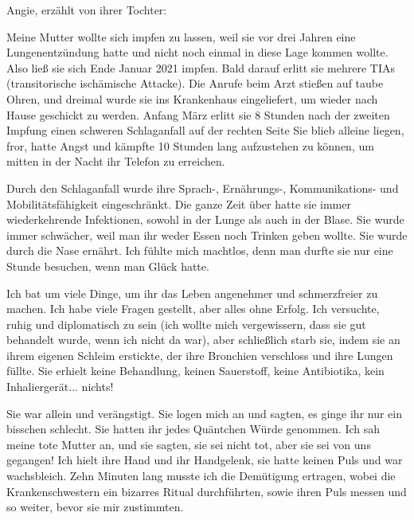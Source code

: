 Angie, erzählt von ihrer Tochter:

Meine Mutter wollte sich impfen zu lassen, weil sie vor drei Jahren eine
Lungenentzündung hatte und nicht noch einmal in diese Lage kommen wollte. Also
ließ sie sich Ende Januar 2021 impfen. Bald darauf erlitt sie mehrere TIAs
(transitorische ischämische Attacke).  Die Anrufe beim Arzt stießen auf taube
Ohren, und dreimal wurde sie ins Krankenhaus eingeliefert, um wieder nach Hause
geschickt zu werden. Anfang März erlitt sie 8 Stunden nach der zweiten Impfung
einen schweren Schlaganfall auf der rechten Seite Sie blieb alleine liegen,
fror, hatte Angst und kämpfte 10 Stunden lang aufzustehen zu können, um mitten
in der Nacht ihr Telefon zu erreichen.

Durch den Schlaganfall wurde ihre Sprach-, Ernährungs-, Kommunikations- und
Mobilitätsfähigkeit eingeschränkt. Die ganze Zeit über hatte sie immer
wiederkehrende Infektionen, sowohl in der Lunge als auch in der Blase. Sie wurde
immer schwächer, weil man ihr weder Essen noch Trinken geben wollte. Sie wurde
durch die Nase ernährt. Ich fühlte mich machtlos, denn man durfte sie nur eine
Stunde besuchen, wenn man Glück hatte.

Ich bat um viele Dinge, um ihr das Leben angenehmer und schmerzfreier zu
machen. Ich habe viele Fragen gestellt, aber alles ohne Erfolg. Ich versuchte,
ruhig und diplomatisch zu sein (ich wollte mich vergewissern, dass sie gut
behandelt wurde, wenn ich nicht da war), aber schließlich starb sie, indem sie
an ihrem eigenen Schleim erstickte, der ihre Bronchien verschloss und ihre
Lungen füllte. Sie erhielt keine Behandlung, keinen Sauerstoff, keine
Antibiotika, kein Inhaliergerät... nichts!

Sie war allein und verängstigt. Sie logen mich an und sagten, es ginge ihr nur
ein bisschen schlecht. Sie hatten ihr jedes Quäntchen Würde genommen. Ich sah
meine tote Mutter an, und sie sagten, sie sei nicht tot, aber sie sei von uns
gegangen! Ich hielt ihre Hand und ihr Handgelenk, sie hatte keinen Puls und war
wachsbleich. Zehn Minuten lang musste ich die Demütigung ertragen, wobei die
Krankenschwestern ein bizarres Ritual durchführten, sowie ihren Puls messen und
so weiter, bevor sie mir zustimmten.
